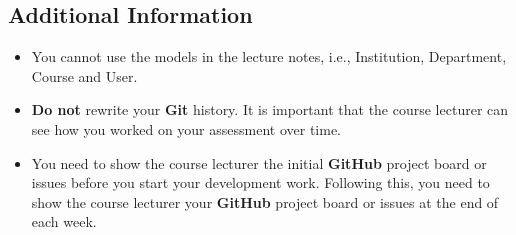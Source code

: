 \documentclass{article}
\begin{document}
\subsection*{Additional Information}
\begin{itemize}
\item You cannot use the models in the lecture notes, i.e., Institution, Department, Course and User.
    \item \textbf{Do not} rewrite your \textbf{Git} history. It is important that the course lecturer can see how you worked on your assessment over time. 
    \item You need to show the course lecturer the initial \textbf{GitHub} project board or issues before you start your development work. Following this, you need to show the course lecturer your \textbf{GitHub} project board or issues at the end of each week.
\end{itemize} 
\end{document}
